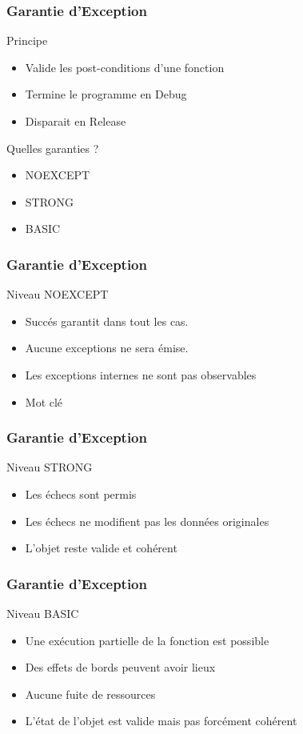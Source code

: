 \documentclass[svgnames]{beamer}
\begin{document}
\frame
{
  \frametitle{Garantie d'Exception}
  \begin{block}{Principe}
  \begin{itemize}
  \item Valide les \alert{post-conditions} d'une fonction
  \item Termine le programme en Debug
  \item Disparait en Release
  \end{itemize}
  \end{block}
  
  \begin{block}{Quelles garanties ?}
  \begin{itemize}
  \item NOEXCEPT
  \item STRONG 
  \item BASIC
  \end{itemize}
  \end{block}
}


\frame
{
  \frametitle{Garantie d'Exception}
  \begin{block}{Niveau NOEXCEPT}
  \begin{itemize}
  \item Succés garantit dans tout les cas. 
  \item Aucune exceptions ne sera émise. 
  \item Les exceptions internes ne sont pas observables
  \item Mot clé 
  \end{itemize}
  \end{block}

}

\frame
{
  \frametitle{Garantie d'Exception}
  \begin{block}{Niveau STRONG}
  \begin{itemize}
  \item Les échecs sont permis
  \item Les échecs ne modifient pas les données originales
  \item L'objet reste valide et cohérent
  \end{itemize}
  \end{block}
}

\frame
{
  \frametitle{Garantie d'Exception}
  \begin{block}{Niveau BASIC}
  \begin{itemize}
  \item Une exécution partielle de la fonction est possible
  \item Des effets de bords peuvent avoir lieux
  \item Aucune fuite de ressources
  \item L'état de l'objet est valide mais pas forcément cohérent
  \end{itemize}
  \end{block}
}
\end{document}
